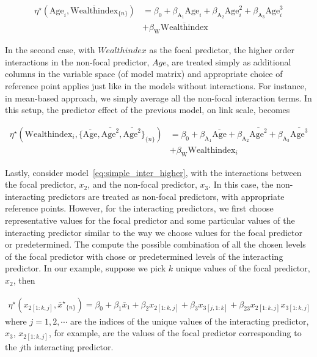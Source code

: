 \documentclass[10pt,letterpaper]{article}
\newcommand{\nset}[1]{#1_{\{n\}}}
\let\over=\overline
\begin{document}
\begin{align*}
\eta^\star(\mathrm{Age}_i, \nset{{\over{\mathrm{Wealthindex}}}}) &= \beta_0 + \beta_{\mathrm{A_1}}\mathrm{Age}_i + \beta_{\mathrm{A_2}}\mathrm{Age}^2_i + \beta_{\mathrm{A_3}}\mathrm{Age}^3_i\\
	& + \beta_{\mathrm{W}}\over{\mathrm{Wealthindex}}
\end{align*}

In the second case, with $Wealthindex$ as the focal predictor, the higher order interactions in the non-focal predictor, $Age$, are treated simply as additional columns in the variable space (of model matrix) and appropriate choice of reference point applies just like in the models without interactions. For instance, in mean-based approach, we simply average all the non-focal interaction terms. In this setup, the predictor effect of the previous model, on link scale, becomes

\begin{align*}
\eta^\star(\mathrm{Wealthindex}_i, \nset{{\{\over{\mathrm{Age}}, \over{\mathrm{Age}^2}, \over{\mathrm{Age}^2}\}}}) &= \beta_0 + \beta_{\mathrm{A_1}}\over{\mathrm{Age}} + \beta_{\mathrm{A_2}}\over{\mathrm{Age}^2} + \beta_{\mathrm{A_3}}\over{\mathrm{Age}^3}\\
	& + \beta_{\mathrm{W}}\mathrm{Wealthindex}_i
\end{align*}

Lastly, consider model~\ref{eq:simple_inter_higher}, with the interactions between the focal predictor, $x_2$, and the non-focal predictor, $x_3$. In this case, the non-interacting predictors are treated as non-focal predictors, with appropriate reference points. However, for the interacting predictors, we first choose representative values for the focal predictor and some particular values of the interacting predictor similar to the way we choose values for the focal predictor or predetermined. The compute the possible combination of all the chosen levels of the focal predictor with chose or predetermined levels of the interacting predictor. In our example, suppose we pick $k$ unique values of the focal predictor, $x_2$, then

\begin{align*}
\eta^\star(x_{2[1:k,j]}, \nset{{\bar{x}^\star}}) = \beta_0 + \beta_1 \bar{x}_1 + \beta_2x_{2[1:k,j]} + \beta_3x_{3[j,1:k]} + \beta_{23}x_{2[1:k,j]}x_{3[1:k,j]}
\end{align*}
where $j = 1, 2, \cdots$ are the indices of the unique values of the interacting predictor, $x_3$, $x_{2[1:k,j]}$, for example, are the values of the focal predictor corresponding to the $j$th interacting predictor.
\end{document}

